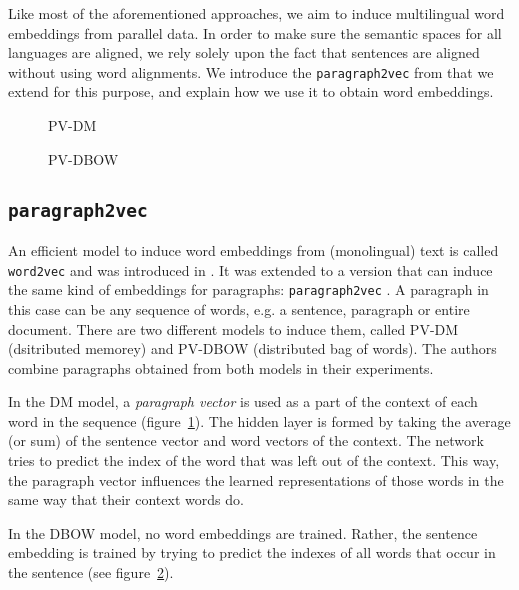 Like most of the aforementioned approaches, we aim to induce multilingual word embeddings from parallel data. In order to make sure the semantic spaces for all languages are aligned, we rely solely upon the fact that sentences are aligned without using word alignments.
We introduce the \texttt{paragraph2vec} from \cite{Le2014} that we extend for this purpose, and explain how we use it to obtain word embeddings.

\begin{figure*}\center
\begin{subfigure}{.45\textwidth}\center

\caption{PV-DM}
\label{fig:p2v-DM}
\end{subfigure}
\begin{subfigure}{.45\textwidth}\center

\caption{PV-DBOW}
\label{fig:p2v-DBOW}
\end{subfigure}
\caption{\texttt{paragraph2vec} models}
\end{figure*}

\subsection{\texttt{paragraph2vec}}
An efficient model to induce word embeddings from (monolingual) text is called \texttt{word2vec}  and was introduced in \cite{mikolov2013efficient}. It was extended to a version that can induce the same kind of embeddings for paragraphs: \texttt{paragraph2vec} \cite{Le2014}. A paragraph in this case can be any sequence of words, e.g. a sentence, paragraph or entire document. There are two different models to induce them, called PV-DM (dsitributed memorey) and PV-DBOW (distributed bag of words). The authors combine paragraphs obtained from both models in their experiments.

In the DM model, a \emph{paragraph vector} is used as a part of the context of each word in the sequence (figure~\ref{fig:p2v-DM}).
The hidden layer is formed by taking the average (or sum) of the sentence vector and word vectors of the context. The network tries to predict the index of the word that was left out of the context.  
This way, the paragraph vector influences the learned representations of those words in the same way that their context words do.



In the DBOW model, no word embeddings are trained. Rather, the sentence embedding is trained by trying to predict the indexes of all words that occur in the sentence (see figure~\ref{fig:p2v-DBOW}).





